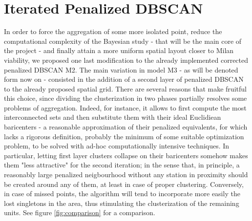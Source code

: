 \documentclass[11pt,twoside]{report}
\begin{document}
\section{Iterated Penalized DBSCAN}
In order to force the aggregation of some more isolated point, reduce the computational complexity of the Bayesian study - that will be the main core of the project - and finally attain a more uniform spatial layout closer to Milan viability, we proposed one last modification to the already implemented corrected penalized DBSCAN M2. The main variation in model M3 - as will be denoted form now on - consisted in the addition of a second layer of penalized DBSCAN to the already proposed spatial grid. There are several reasons that make fruitful this choice, since dividing the clusterization in two phases partially resolves some problems of aggregation. Indeed, for instance, it allows to first compute the most interconnected sets and then substitute them with their ideal Euclidiean baricenters - a reasonable approximation of their penalized equivalents, for which lacks a rigorous definition, probably the minimum of some suitable optimization problem, to be solved with ad-hoc computationally intensive techniques. In particular, letting first layer clusters collapse on their baricenters somehow makes them "less attractive" for the second iteration; in the sense that, in principle, a reasonably large penalized neigbourhood without any station in proximity should be created around any of them, at least in case of proper clustering. Conversely, in case of missed points, the algorithm will tend to incorporate more easily the lost singletons in the area, thus stimulating the clusterization of the remaining units. See figure \ref{fig:comparison} for a comparison.
\end{document}
